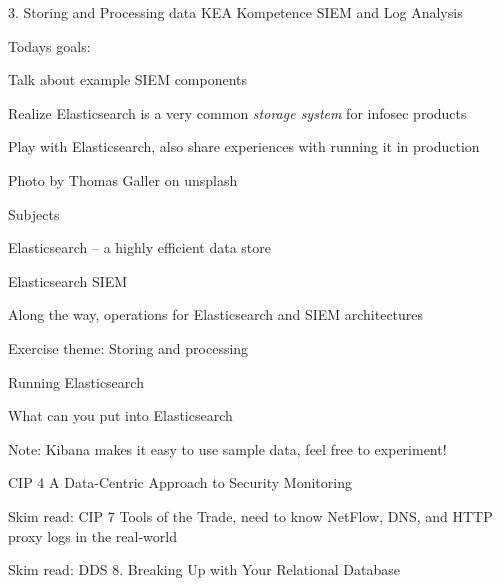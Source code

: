 \documentclass[Screen16to9,17pt]{foils}
\begin{document}
\mytitlepage
{3. Storing and Processing data}
{KEA Kompetence SIEM and Log Analysis}




Todays goals:
\begin{list2}
\item Talk about example SIEM components
\item Realize Elasticsearch is a very common \emph{storage system} for infosec products
\item Play with Elasticsearch, also share experiences with running it in production
\end{list2}

Photo by Thomas Galler on unsplash


\begin{list1}
\item Subjects
\begin{list2}
\item Elasticsearch -- a highly efficient data store
\item Elasticsearch SIEM
\item Along the way, operations for Elasticsearch and SIEM architectures
\end{list2}
\item Exercise theme: Storing and processing
\begin{list2}
\item Running Elasticsearch
\item What can you put into Elasticsearch

\end{list2}
\end{list1}




Note: Kibana makes it easy to use sample data, feel free to experiment!



\begin{list1}
\item CIP 4 A Data-Centric Approach to Security Monitoring
\item Skim read: CIP 7 Tools of the Trade, need to know NetFlow, DNS, and HTTP proxy logs in the real-world
\item Skim read: DDS 8. Breaking Up with Your Relational Database
\end{list1}
\end{document}
